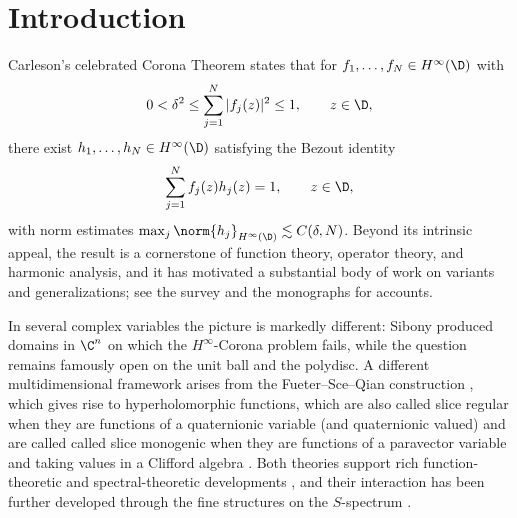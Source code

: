 \documentclass[11pt]{amsart}
\begin{document}
\section{Introduction}

Carleson's celebrated Corona Theorem \cite{MR0141789} states that for $f_1,\ldots,f_N\in H^\infty(\D)$ with
\[
0<\delta^2\le \sum_{j=1}^N |f_j(z)|^2\le 1,\qquad z\in\D,
\]
there exist $h_1,\ldots,h_N\in H^\infty(\D)$ satisfying the Bezout identity
\[
\sum_{j=1}^N f_j(z)h_j(z)=1,\qquad z\in\D,
\]
with norm estimates $\max_j \norm{h_j}_{H^\infty(\D)}\lesssim C(\delta,N)$.  Beyond its intrinsic appeal, the result is a cornerstone of function theory, operator theory, and harmonic analysis, and it has motivated a substantial body of work on variants and generalizations; see the survey \cite{MR3329539} and the monographs \cites{MR1419088,MR2261424,MR1669574,MR0827223} for accounts.

In several complex variables the picture is markedly different: Sibony \cite{MR0916722} produced domains in $\C^n$ on which the $H^\infty$-Corona problem fails, while the question remains famously open on the unit ball and the polydisc.  A different multidimensional framework arises from the Fueter--Sce--Qian construction \cite{MR4240465}, which gives rise to hyperholomorphic functions, which are also called slice regular when they are functions of a quaternionic variable (and quaternionic valued) \cites{MR3013643,MR2752913,MR3585395} and are called called slice monogenic when they are functions of a paravector variable and taking values in a Clifford algebra \cites{MR2089988,MR3496962,MR1169463}.  Both theories support rich function-theoretic and spectral-theoretic developments \cites{MR3967697,MR3887616,MR3930595,MR2069293}, and their interaction has been further developed through the fine structures on the $S$-spectrum \cites{MR4502763,MR4576314,MR4674273,MR4741057}.
\end{document}
